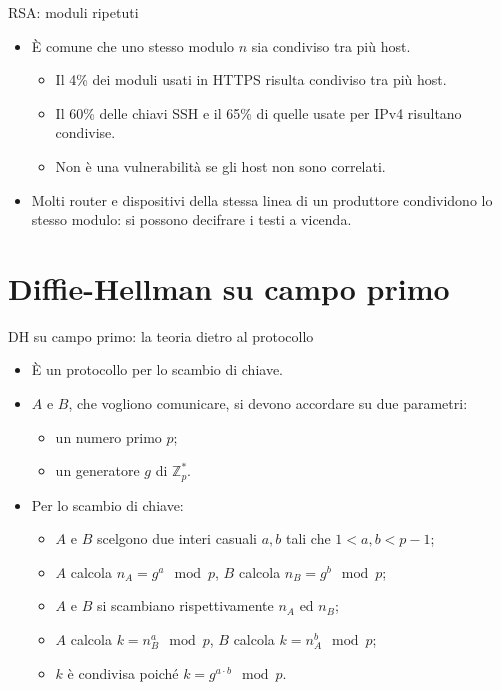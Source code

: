 \documentclass[11pt,svgnames,smaller,aspectratio=169,italian]{beamer}
\begin{document}
\begin{frame}{RSA: moduli ripetuti}
	\begin{itemize}
		\item È comune che uno stesso modulo $n$ sia condiviso tra più host.
			\begin{itemize}
				\item Il 4\% dei moduli usati in HTTPS risulta condiviso tra più host.
				\item Il 60\% delle chiavi SSH e il 65\% di quelle usate per IPv4 risultano condivise.
				\item Non è una vulnerabilità se gli host non sono correlati.
			\end{itemize}
		\item Molti router e dispositivi della stessa linea di un produttore condividono lo stesso modulo: si possono decifrare i testi a vicenda.
	\end{itemize}
\end{frame}

\section{Diffie-Hellman su campo primo}
\begin{frame}
	\sectionpage
	\centering
\end{frame}

\begin{frame}{DH su campo primo: la teoria dietro al protocollo}
	\begin{itemize}
		\item È un protocollo per lo scambio di chiave.
		\item $A$ e $B$, che vogliono comunicare, si devono accordare su due parametri:
			\begin{itemize}
				\item un numero primo $p$;
				\item un generatore $g$ di $\mathds{Z}_{p}^{*}$.
			\end{itemize}
		\item Per lo scambio di chiave:
			\begin{itemize}
				\item $A$ e $B$ scelgono due interi casuali $a, b$ tali che $1 < a, b < p - 1$;
				\item $A$ calcola $n_{A} = g^{a} \mod p$, $B$ calcola $n_{B} = g^{b} \mod p$;
				\item $A$ e $B$ si scambiano rispettivamente $n_{A}$ ed $n_{B}$;
				\item $A$ calcola $k = n_{B}^{a} \mod p$, $B$ calcola $k = n_{A}^{b} \mod p$;
				\item $k$ è condivisa poiché $k = g^{a \cdot b} \mod p$.
			\end{itemize}
	\end{itemize}
\end{frame}
\end{document}
